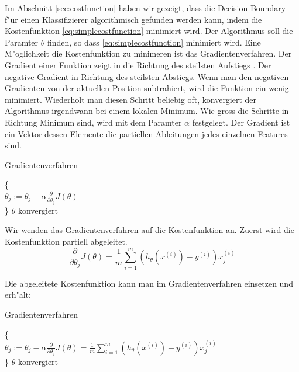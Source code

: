 \documentclass[12pt,a4paper,twoside]{article}
\begin{document}
Im Abschnitt \ref{sec:costfunction} haben wir gezeigt, dass die Decision Boundary f"ur einen Klassifizierer algorithmisch gefunden werden kann, indem die Kostenfunktion \ref{eq:simplecostfunction} minimiert wird. Der Algorithmus soll die Paramter $\theta$ finden, so dass \ref{eq:simplecostfunction} minimiert wird. Eine M"oglichkeit die Kostenfunktion zu minimeren ist das Gradientenverfahren. Der Gradient einer Funktion zeigt in die Richtung des steilsten Aufstiegs \cite{teschl07}. Der negative Gradient in Richtung des steilsten Abstiegs. Wenn man den negativen Gradienten von der aktuellen Position subtrahiert, wird die Funktion ein wenig minimiert. Wiederholt man diesen Schritt beliebig oft, konvergiert der Algorithmus irgendwann bei einem lokalen Minimum. Wie gross die Schritte in Richtung Minimum sind, wird mit dem Paramter $\alpha$ festgelegt. Der Gradient ist ein Vektor dessen Elemente die partiellen Ableitungen jedes einzelnen Features sind.

\begin{algorithm}
\caption{Gradientenverfahren}
\begin{algorithmic}

\Repeat \{ \\
$\theta_j := \theta_j - \alpha \frac{\partial}{\partial \theta_j} J(\theta)$  \\
\}
\Until $\theta$ konvergiert 

 \end{algorithmic}  
\end{algorithm}

Wir wenden das Gradientenverfahren auf die Kostenfunktion an. Zuerst wird die Kostenfunktion partiell abgeleitet.
\begin{equation}
  \label{eq:costderivativ}
  \frac{\partial}{\partial \theta_j} J(\theta) = \frac{1}{m} \sum_{i=1}^m (h_{\theta} (x^{(i)}) - y^{(i)})x_j^{(i)}
\end{equation}

Die abgeleitete Kostenfunktion kann man im Gradientenverfahren einsetzen und erh"alt:
\begin{algorithm}
\caption{Gradientenverfahren}
\begin{algorithmic}

\Repeat \{ \\
$\theta_j := \theta_j - \alpha \frac{\partial}{\partial \theta_j} J(\theta) = \frac{1}{m} \sum_{i=1}^m (h_{\theta} (x^{(i)}) - y^{(i)})x_j^{(i)}$  \\
\}
\Until $\theta$ konvergiert 

 \end{algorithmic}  
\end{algorithm}
\end{document}
